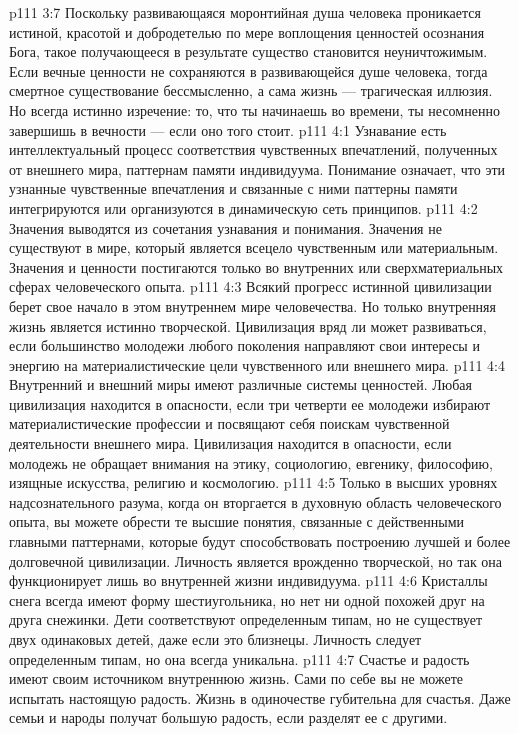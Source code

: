 \vs p111 3:7 Поскольку развивающаяся моронтийная душа человека проникается истиной, красотой и добродетелью по мере воплощения ценностей осознания Бога, такое получающееся в результате существо становится неуничтожимым. Если вечные ценности не сохраняются в развивающейся душе человека, тогда смертное существование бессмысленно, а сама жизнь --- трагическая иллюзия. Но всегда истинно изречение: то, что ты начинаешь во времени, ты несомненно завершишь в вечности --- если оно того стоит.
\vs p111 4:1 Узнавание есть интеллектуальный процесс соответствия чувственных впечатлений, полученных от внешнего мира, паттернам памяти индивидуума. Понимание означает, что эти узнанные чувственные впечатления и связанные с ними паттерны памяти интегрируются или организуются в динамическую сеть принципов.
\vs p111 4:2 Значения выводятся из сочетания узнавания и понимания. Значения не существуют в мире, который является всецело чувственным или материальным. Значения и ценности постигаются только во внутренних или сверхматериальных сферах человеческого опыта.
\vs p111 4:3 \pc Всякий прогресс истинной цивилизации берет свое начало в этом внутреннем мире человечества. Но только внутренняя жизнь является истинно творческой. Цивилизация вряд ли может развиваться, если большинство молодежи любого поколения направляют свои интересы и энергию на материалистические цели чувственного или внешнего мира.
\vs p111 4:4 Внутренний и внешний миры имеют различные системы ценностей. Любая цивилизация находится в опасности, если три четверти ее молодежи избирают материалистические профессии и посвящают себя поискам чувственной деятельности внешнего мира. Цивилизация находится в опасности, если молодежь не обращает внимания на этику, социологию, евгенику, философию, изящные искусства, религию и космологию.
\vs p111 4:5 Только в высших уровнях надсознательного разума, когда он вторгается в духовную область человеческого опыта, вы можете обрести те высшие понятия, связанные с действенными главными паттернами, которые будут способствовать построению лучшей и более долговечной цивилизации. Личность является врожденно творческой, но так она функционирует лишь во внутренней жизни индивидуума.
\vs p111 4:6 \pc Кристаллы снега всегда имеют форму шестиугольника, но нет ни одной похожей друг на друга снежинки. Дети соответствуют определенным типам, но не существует двух одинаковых детей, даже если это близнецы. Личность следует определенным типам, но она всегда уникальна.
\vs p111 4:7 \pc Счастье и радость имеют своим источником внутреннюю жизнь. Сами по себе вы не можете испытать настоящую радость. Жизнь в одиночестве губительна для счастья. Даже семьи и народы получат большую радость, если разделят ее с другими.
